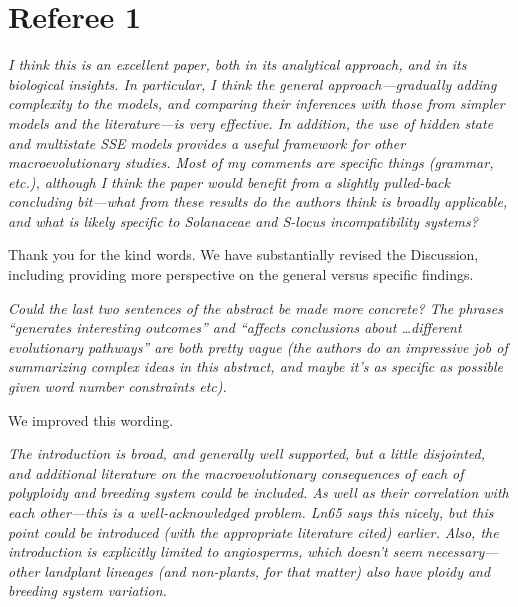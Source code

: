 \documentclass[11pt]{article}
\renewenvironment{quote}{\bigskip\noindent\itshape\ignorespaces}{\smallskip}
\begin{document}
\section{Referee 1}
\vspace{-11pt}


\begin{quote}
I think this is an excellent paper, both in its analytical approach, and in its biological insights.
In particular, I think the general approach---gradually adding complexity to the models, and comparing their inferences with those from simpler models and the literature---is very effective.
In addition, the use of hidden state and multistate SSE models provides a useful framework for other macroevolutionary studies. 
Most of my comments are specific things (grammar, etc.), although I think the paper would benefit from a slightly pulled-back concluding bit---what from these results do the authors think is broadly applicable, and what is likely specific to Solanaceae and S-locus incompatibility systems?
\end{quote}

Thank you for the kind words.
We have substantially revised the Discussion, including providing more perspective on the general versus specific findings. %


\begin{quote}
Could the last two sentences of the abstract be made more concrete?
The phrases ``generates interesting outcomes'' and ``affects conclusions about \ldots different evolutionary pathways'' are both pretty vague (the authors do an impressive job of summarizing complex ideas in this abstract, and maybe it's as specific as possible given word number constraints etc).
\end{quote}

We improved this wording.


\begin{quote}
The introduction is broad, and generally well supported, but a little disjointed, and additional literature on the macroevolutionary consequences of each of polyploidy and breeding system could be included.
As well as their correlation with each other---this is a well-acknowledged problem.
Ln65 says this nicely, but this point could be introduced (with the appropriate literature cited) earlier.
Also, the introduction is explicitly limited to angiosperms, which doesn't seem necessary---other landplant lineages (and non-plants, for that matter) also have ploidy and breeding system variation.
\end{quote}
\end{document}
